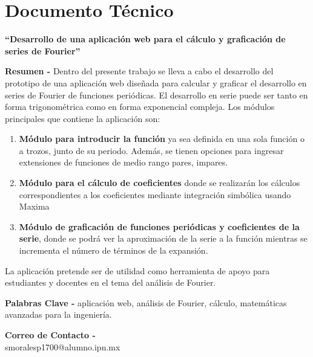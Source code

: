 \chapter{Documento Técnico}
\begin{center}
	\textbf{\Large “Desarrollo de una aplicación web para el cálculo y graficación de series de Fourier”}
	\vspace{0.5cm}
\end{center}

\textbf{Resumen -} Dentro del presente trabajo se lleva a cabo el desarrollo del prototipo de una aplicación web diseñada para calcular y graficar el desarrollo en series de Fourier de funciones periódicas. El desarrollo en serie puede ser tanto en forma trigonométrica como en forma exponencial compleja. Los módulos principales que contiene la aplicación son:

\begin{enumerate}
	\item \textbf{Módulo para introducir la función} ya sea definida en una sola función o a trozos, junto de su periodo. Además, se tienen opciones para ingresar extensiones de funciones de medio rango pares, impares.
	\item \textbf{Módulo para el cálculo de coeficientes} donde se realizarán los cálculos correspondientes a los coeficientes mediante integración simbólica usando Maxima
	\item \textbf{Módulo de graficación de funciones periódicas y coeficientes de la serie}, donde se podrá ver la aproximación de la serie a la función mientras se incrementa el número de términos de la expansión.
\end{enumerate}

 La aplicación pretende ser de utilidad como herramienta de apoyo para estudiantes y docentes en el tema del análisis de Fourier.

\vspace{0.5cm}

\textbf{Palabras Clave -} aplicación web, análisis de Fourier, cálculo, matemáticas avanzadas para la ingeniería.

\vspace{0.5cm}

\textbf{Correo de Contacto -} \\
smoralesp1700@alumno.ipn.mx \\